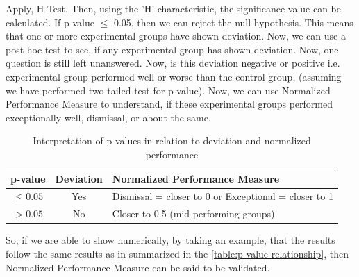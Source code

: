 \documentclass[a4paper,fleqn,review]{cas-sc}
\begin{document}
Apply, \cite{kruskal1952use} H Test. Then, using the 'H' characteristic, the significance value can be calculated. If p-value $\le$ 0.05, then we can reject the null hypothesis. This means that one or more experimental groups have shown deviation. Now, we can use a post-hoc \cite{dunnett1955multiple} test to see, if any experimental group has shown deviation. Now, one question is still left unanswered. Now, is this deviation negative or positive i.e. experimental group performed well or worse than the control group, (assuming we have performed two-tailed test for p-value). Now, we can use Normalized Performance Measure to understand, if these experimental groups performed exceptionally well, dismissal, or about the same.
\begin{table}
	\centering
	\begin{tabular}{|c|c|l|}
		\hline
		\textbf{p-value} & \textbf{Deviation} & \textbf{Normalized Performance Measure} \\
		\hline
		$\leq 0.05$ & Yes & Dismissal = closer to 0 or Exceptional = closer to 1 \\
		\hline
		$> 0.05$ & No & Closer to 0.5 (mid-performing groups) \\
		\hline
	\end{tabular}
	\vspace{2pt}
	\caption{Interpretation of p-values in relation to deviation and normalized performance}
	\label{table:p-value-relationship}
\end{table}
So, if we are able to show numerically, by taking an example, that the results follow the same results as in summarized in the \autoref{table:p-value-relationship}, then Normalized Performance Measure can be said to be validated.
\end{document}
